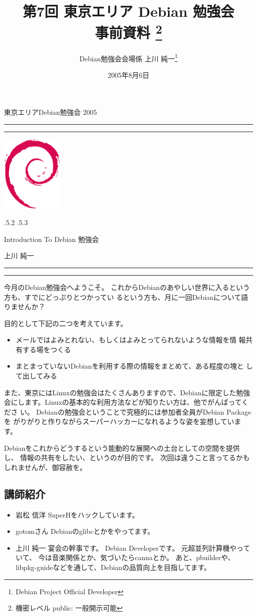 \documentclass[mingoth]{jsarticle}
\makeatletter
\renewcommand{\section}{\@startsection{section}{1}{\z@}%
    {\Cvs \@plus.5\Cdp \@minus.2\Cdp}%
    {.5\Cvs \@plus.3\Cdp}%
    {\normalfont\Large\headfont\raggedright\centering}} %
\newcommand{\dancersection}[2]{%
\newpage
東京エリアDebian勉強会 2005
\hrule
\vspace{0.5mm}
\hrule
\hfill{}\includegraphics[width=3cm]{image200502/openlogo-nd.eps}\\
\vspace{-4cm}
\begin{center}
  \section{#1}
\end{center}
\hfill{}#2\hspace{3cm}\space\\
\hrule
\hrule
\vspace{1cm}
}
\makeatother
\begin{document}
\begin{titlepage}

\title{
 第7回 東京エリア Debian 勉強会\\事前資料
\footnote{機密レベル public: 一般開示可能}}
\date{2005年8月6日}
\author{Debian勉強会会場係 上川 純一\thanks{Debian Project Official Developer}} 
\maketitle

\end{titlepage}

\newpage
\tableofcontents

\dancersection{Introduction To Debian 勉強会}{上川 純一}

今月のDebian勉強会へようこそ。
これからDebianのあやしい世界に入るという方も、すでにどっぷりとつかってい
るという方も、月に一回Debianについて語りませんか？

目的として下記の二つを考えています。

\begin{itemize}
 \item メールではよみとれない、もしくはよみとってられないような情報を情
       報共有する場をつくる
 \item まとまっていないDebianを利用する際の情報をまとめて、ある程度の塊と
       して出してみる
\end{itemize}

また、東京にはLinuxの勉強会はたくさんありますので、Debianに限定した勉強
会にします。Linuxの基本的な利用方法などが知りたい方は、他でがんばってくださ
い。
Debianの勉強会ということで究極的には参加者全員がDebian Packageを
がりがりと作りながらスーパーハッカーになれるような姿を妄想しています。

Debianをこれからどうするという能動的な展開への土台としての空間を提供し、
情報の共有をしたい、というのが目的です。
次回は違うこと言ってるかもしれませんが、御容赦を。

\subsection{講師紹介}

\begin{itemize}
 \item{岩松 信洋} SuperHをハックしています。
 \item{gotomさん} Debianのglibcとかをやってます。
 \item{上川 純一} 宴会の幹事です。
      Debian Developerです。
      元超並列計算機やっていて、
      今は音楽関係とか、気づいたらcannaとか。
      あと、pbuilderや、libpkg-guideなどを通して、Debianの品質向上を目指してます。
\end{itemize}
\end{document}
